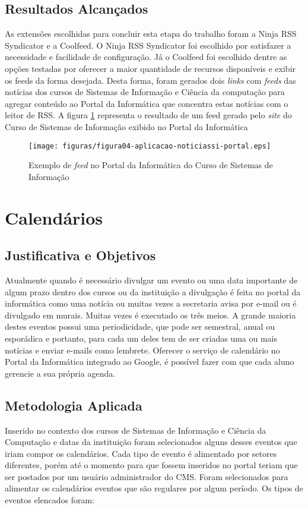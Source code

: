 \subsection{Resultados Alcançados}
As extensões escolhidas para concluir esta etapa do trabalho foram a Ninja RSS Syndicator e a Coolfeed. O Ninja RSS Syndicator foi escolhido por satisfazer a necessidade e facilidade de configuração. Já o Coolfeed foi escolhido dentre as opções testadas por oferecer a maior quantidade de recursos disponíveis e exibir os feeds da forma desejada. 
Desta forma, foram gerados dois \emph{links} com \emph{feeds} das notícias dos cursos de Sistemas de Informação e Ciência da computação para agregar conteúdo ao Portal da Informática que concentra estas notícias com o leitor de RSS. A figura \ref{fig:Noticias-si} representa o resultado de um feed gerado pelo \emph{site} do Curso de Sistemas de Informação exibido no Portal da Informática

\begin{figure}[hbtn]
   \centering
   \texttt{[image: figuras/figura04-aplicacao-noticiassi-portal.eps]}
   \caption{Exemplo de \emph{feed} no Portal da Informática do Curso de Sistemas de Informação}
   \label{fig:Noticias-si}
\end{figure}

\section{Calendários}
\subsection{Justificativa e Objetivos}
Atualmente quando é necessário divulgar um evento ou uma data importante de algum prazo dentro dos cursos ou da instituição a divulgação é feita no portal da informática como uma notícia ou muitas vezes a secretaria avisa por e-mail ou é divulgado em murais. Muitas vezes é executado os três meios. A grande maioria destes eventos possui uma periodicidade, que pode ser semestral, anual ou esporádica e portanto, para cada um deles tem de ser criadas uma ou mais notícias e enviar e-mails como lembrete. Oferecer o serviço de calendário no Portal da Informática integrado ao Google, é possível fazer com que cada aluno gerencie a sua própria agenda.

\subsection{Metodologia Aplicada}
Inserido no contexto dos cursos de Sistemas de Informação e Ciência da Computação e datas da instituição foram selecionados alguns desses eventos que iriam compor os calendários. Cada tipo de evento é alimentado por setores diferentes, porém até o momento para que fossem inseridos no portal teriam que ser postados por um usuário administrador do CMS. Foram selecionados para alimentar os calendários eventos que são regulares por algum período. Os tipos de eventos elencados foram:

